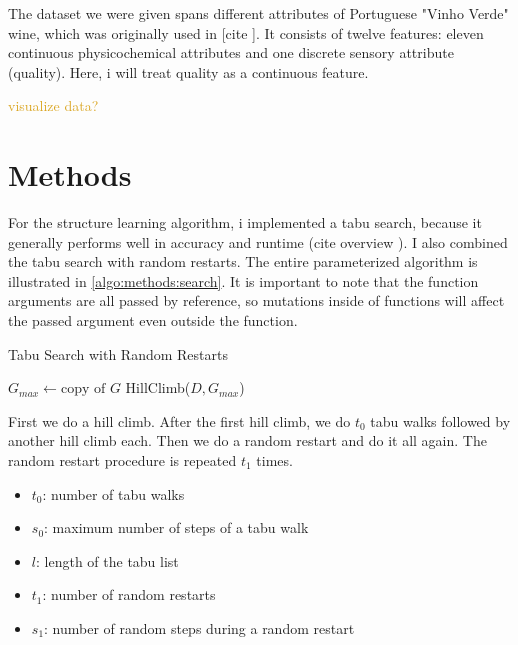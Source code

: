 \documentclass[sigconf, fleqn, prologue, dvipsnames]{acmart}
\newcommand{\maybe}[1]{%
	\textcolor{Goldenrod}{#1?}%
    \reversemarginpar%
    \marginpar{\raggedleft\textcolor{Goldenrod}{\rule{2mm}{2mm}}}%
}
\def\ndy{%
    \reversemarginpar%
    \marginpar{\raggedleft\textcolor{red}{\rule{2mm}{2mm}}}%
}
\begin{document}
The dataset we were given spans different attributes of Portuguese "Vinho Verde" wine, which was originally used in [cite\ndy].
It consists of twelve features: eleven continuous physicochemical attributes and one discrete sensory attribute (quality).
Here, i will treat quality as a continuous feature.

\maybe{visualize data}
\FloatBarrier


\section{Methods}
For the structure learning algorithm, i implemented a tabu search, because it generally performs well in accuracy and runtime (cite overview\ndy).
I also combined the tabu search with random restarts. The entire parameterized algorithm is illustrated in \autoref{algo:methods:search}.
It is important to note that the function arguments are all passed by reference, so mutations inside of functions will affect the passed argument even outside the function.

\begin{algorithm}
	\caption{Tabu Search with Random Restarts}
	\label{algo:methods:search}

	$G_{max} \gets \text{copy of } G$\;
	HillClimb($D, G_{max}$)\;
\end{algorithm}

First we do a hill climb. After the first hill climb, we do $t_0$ tabu walks followed by another hill climb each.
Then we do a random restart and do it all again. The random restart procedure is repeated $t_1$ times.
\begin{itemize}
	\item $t_0$: number of tabu walks
	\item $s_0$: maximum number of steps of a tabu walk
	\item $l$: length of the tabu list
	\item $t_1$: number of random restarts
	\item $s_1$: number of random steps during a random restart
\end{itemize}
\end{document}
